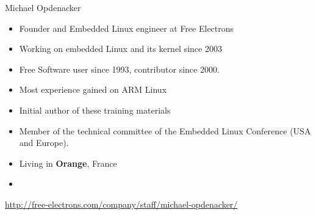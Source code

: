 \begin{frame}{Michael Opdenacker}
    \begin{itemize}
	\item Founder and Embedded Linux engineer at Free Electrons
	\item Working on embedded Linux and its kernel since 2003
	\item Free Software user since 1993, contributor since 2000.
	\item Most experience gained on ARM Linux
	\item Initial author of these training materials
	\item Member of the technical committee of the Embedded Linux
	      Conference (USA and Europe).
	\item Living in {\bf Orange}, France
	\item {}
    \end{itemize}
    {\small \url{http://free-electrons.com/company/staff/michael-opdenacker/}}
\end{frame}
